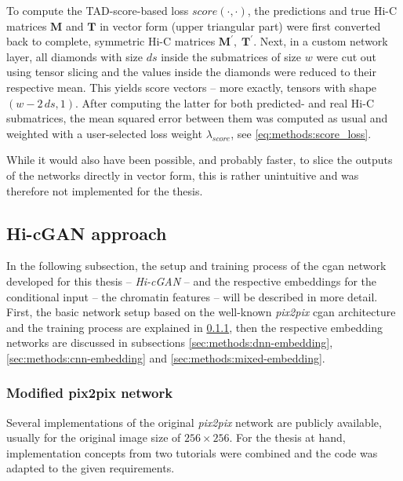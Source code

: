 To compute the TAD-score-based loss $\mathit{score}(\cdot,\cdot)$, the predictions and true Hi-C matrices $\mathbf{M}$ and $\mathbf{T}$ in vector form (upper triangular part)
were first converted back to complete, symmetric Hi-C matrices $\mathbf{M}^\prime,\; \mathbf{T}^\prime$. 
Next, in a custom network layer, all diamonds with size $ds$ inside the submatrices of size $w$ were cut out using tensor slicing and the values inside the diamonds were reduced to their respective mean.
This yields score vectors -- more exactly, tensors with shape $(w - 2\,ds, 1)$.
After computing the latter for both predicted- and real Hi-C submatrices, the mean squared error between them was computed as usual and weighted with 
a user-selected loss weight $\lambda_\mathit{score}$, see \cref{eq:methods:score_loss}.

While it would also have been possible, and probably faster, to slice the outputs of the networks directly in vector form, 
this is rather unintuitive and was therefore not implemented for the thesis. 

\subsection{Hi-cGAN approach} \label{sec:methods:hicgan}
In the following subsection, the setup and training process of the \acrshort{cgan} network developed for this thesis -- \emph{Hi-cGAN} -- and the respective
embeddings for the conditional input -- the chromatin features -- will be described in more detail.
First, the basic network setup based on the well-known \emph{pix2pix} \acrshort{cgan} architecture \cite{Isola2017} and the training process
are explained in \cref{sec:methods:cGAN_initial}, then the respective embedding networks are discussed in subsections \ref{sec:methods:dnn-embedding},
\ref{sec:methods:cnn-embedding} and \ref{sec:methods:mixed-embedding}.

\subsubsection{Modified pix2pix network}\label{sec:methods:cGAN_initial}
Several implementations of the original \emph{pix2pix} network \cite{Isola2017} are publicly available, usually for the original image size of $256\times256$.
For the thesis at hand, implementation concepts from two tutorials \cite{tfpix2pix2020, brownlee2019} were combined and the code was adapted to the given requirements.

